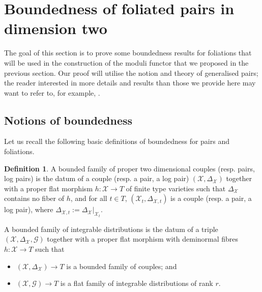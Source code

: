 \documentclass[12pt, a4paper]{amsart}
\theoremstyle{definition}
\newtheorem{definition}[theorem]{Definition}
\theoremstyle{named}
\begin{document}
\section{Boundedness of foliated pairs in dimension two}
\label{s_boundedness}

The goal of this section is to prove some boundedness results for foliations that will be used in the construction of the moduli functor that we proposed in the previous section.
Our proof will utilise the notion and theory of generalised pairs; the reader interested in more details and results than those we provide here may want to refer to, for example, 
\cite{birkar-zhang}.

 \subsection{Notions of boundedness}
Let us recall the following basic definitions of boundedness for pairs and foliations.


\begin{definition}
\label{def.boundedness}
    A bounded family of proper two dimensional couples 
    (resp. pairs, log pairs) 
    is the datum of a couple 
    (resp. a pair, a log pair) 
    $(\mathcal X, \Delta_{\mathcal X})$
    together with a proper flat morphism 
    $h 
    \colon 
    \mathcal X 
    \to 
    T$
    of finite type varieties such that 
    $\Delta_{\mathcal X}$
    contains no fiber of 
    $h$, 
    and for all 
    $t \in T$, 
    $(\mathcal X_t, \Delta_{\mathcal X, t})$
    is a couple
    (resp. a pair, a log pair), 
    where 
    $\Delta_{\mathcal X, t} := \Delta_{\mathcal X}\vert_{\mathcal X_t}$.

    A bounded family of integrable distributions is the datum of a triple 
    $(\mathcal X, \Delta_{\mathcal X},   \mathcal G)$
    together with  a proper flat morphism with deminormal fibres
        $h \colon \mathcal X \to T$ such that
    \begin{itemize}  
        \item $(\mathcal X, \Delta_{\mathcal X}) \to T$
        is a bounded family of couples; and 

        
        \item $(\mathcal X, \mathcal G) \to T$ is a flat family of integrable distributions of rank $r$.


    \end{itemize}

\end{definition}
\end{document}
